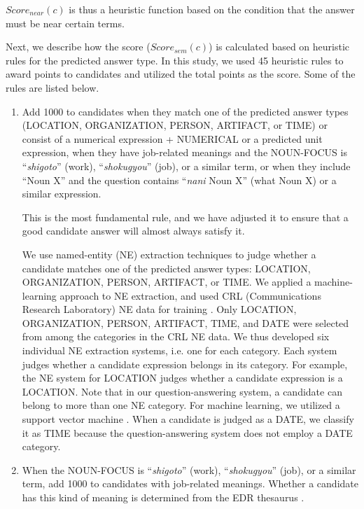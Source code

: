 $Score_{near}(c)$ is thus a heuristic function based on the condition that the answer 
must be near certain terms. 

Next, we describe how the score ($Score_{sem}(c)$) is calculated based on heuristic rules for the 
predicted answer type. In this study, we used 45 heuristic rules to award points to candidates and 
utilized the total points as the score. Some of the rules are listed
below. 
\begin{enumerate}
\item 
Add 1000 to candidates when they match one of the predicted answer types (LOCATION, 
ORGANIZATION, PERSON, ARTIFACT, or TIME) or consist of a numerical 
expression + NUMERICAL or a predicted unit expression, 
when they have job-related meanings and the NOUN-FOCUS 
is ``{\it shigoto}'' (work), ``{\it shokugyou}'' (job), or a similar term, or when they include ``Noun X'' and the question 
contains ``{\it nani} Noun X'' (what Noun X) or a similar expression.

This is the most fundamental rule, and we have adjusted it 
to ensure that a good candidate
answer will almost always satisfy it. 

We use named-entity (NE) extraction techniques to judge whether a candidate matches 
one of the predicted answer types: LOCATION, ORGANIZATION, PERSON, ARTIFACT, or TIME. We applied a machine-learning 
approach to NE extraction, and used CRL (Communications Research 
Laboratory) NE data for training \cite{acl_NE}. Only 
LOCATION, ORGANIZATION, PERSON, ARTIFACT, TIME, and DATE were selected from 
among the categories in the CRL NE data. We thus developed six individual NE extraction systems, i.e. 
one for each category. 
Each system judges whether a candidate expression belongs in its 
category. For example, the NE system for LOCATION judges whether a candidate expression is a 
LOCATION. Note that in our question-answering system, a candidate can belong to more than one NE category. 
For machine learning, we utilized a support vector machine
\cite{SVM,kudoh_svm,yamada_ipsj_svm_ne_eng}. When a candidate is judged as a 
DATE, we classify it as TIME because the question-answering system does not employ a DATE category. 

\item 
When the NOUN-FOCUS is ``{\it shigoto}'' (work), ``{\it shokugyou}'' (job), or a similar term, add 1000 to 
candidates with job-related meanings. Whether a candidate has 
this kind of meaning is determined from the EDR thesaurus \cite{EDR93e}. 


\end{enumerate}
